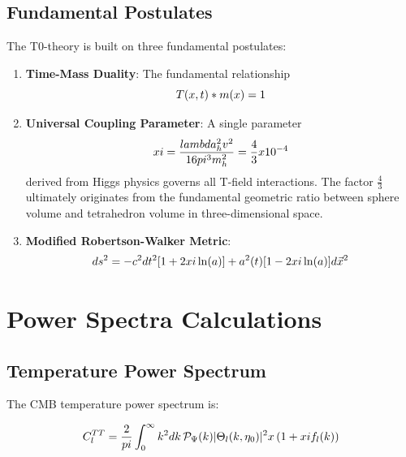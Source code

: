 \documentclass[12pt,a4paper]{report}
\begin{document}
	\subsection{Fundamental Postulates}
	
	The T0-theory is built on three fundamental postulates:
	
	\begin{enumerate}
		\item \textbf{Time-Mass Duality}: The fundamental relationship
		\begin{equation}
			T(x,t) * m(x) = 1
			\label{eq:time_mass_duality}
		\end{equation}
		
		\item \textbf{Universal Coupling Parameter}: A single parameter
		\begin{equation}
			xi = \frac{lambda_h^2 v^2}{16pi^3 m_h^2} = \frac{4}{3} x 10^{-4}
			\label{eq:xi_definition}
		\end{equation}
		derived from Higgs physics governs all T-field interactions. The factor $\frac{4}{3}$ ultimately originates from the fundamental geometric ratio between sphere volume and tetrahedron volume in three-dimensional space.
		
		\item \textbf{Modified Robertson-Walker Metric}:
		\begin{equation}
			ds^2 = -c^2dt^2[1 + 2xi\ln(a)] + a^2(t)[1 - 2xi\ln(a)]d\vec{x}^2
			\label{eq:modified_metric}
		\end{equation}
	\end{enumerate}
	
	\section{Power Spectra Calculations}
	\label{sec:power_spectra}
	
	\subsection{Temperature Power Spectrum}
	
	The CMB temperature power spectrum is:
	
	\begin{equation}
		C_l^{TT} = \frac{2}{pi}\int_0^\infty k^2 dk \, \mathcal{P}_\Psi(k) |\Theta_l(k,\eta_0)|^2 x \left(1 + xi f_l(k)\right)
		\label{eq:cl_tt}
	\end{equation}
	
\end{document}
